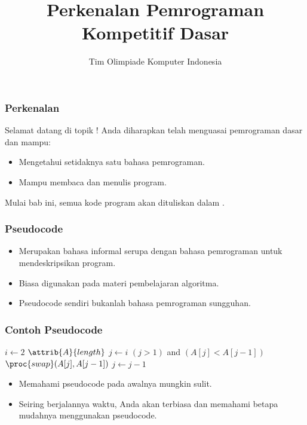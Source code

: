 

\title{Perkenalan Pemrograman Kompetitif Dasar}
\author{Tim Olimpiade Komputer Indonesia}
\date{}



\begin{frame}
\titlepage
\end{frame}

\begin{frame}
\frametitle{Perkenalan}
Selamat datang di topik !
\newline
\newline
Anda diharapkan telah menguasai pemrograman dasar dan mampu:
\begin{itemize}
  \item Mengetahui setidaknya satu bahasa pemrograman.
  \item Mampu membaca dan menulis program.
\end{itemize}
Mulai bab ini, semua kode program akan dituliskan dalam .
\end{frame}

\begin{frame}
\frametitle{Pseudocode}
\begin{itemize}
  \item Merupakan bahasa informal serupa dengan bahasa pemrograman untuk mendeskripsikan program.
  \item Biasa digunakan pada materi pembelajaran algoritma.
  \item Pseudocode sendiri bukanlah bahasa pemrograman sungguhan.
\end{itemize}
\end{frame}


\begin{frame}
\frametitle{Contoh Pseudocode}
\begin{codebox}
\li \For $i \gets 2$ \To $\attrib{A}{length}$
    \Do
\li   $j \gets i$
\li   \While $(j > 1)$ and $(A[j] < A[j-1])$
      \Do
\li     $\proc{swap}(A[j], A[j-1])$
\li     $j \gets j-1$
      \End
    \End
\end{codebox}

\begin{itemize}
  \item Memahami pseudocode pada awalnya mungkin sulit.
  \item Seiring berjalannya waktu, Anda akan terbiasa dan memahami betapa mudahnya menggunakan pseudocode.
\end{itemize}
\end{frame}


